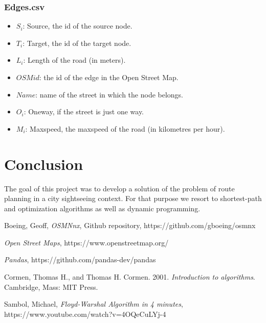 \documentclass{article}
\begin{document}
\subsubsection*{Edges.csv}
\begin{itemize}
    \item $S_i$: Source, the id of the source node.
    \item $T_i$: Target, the id of the target node.
    \item $L_i$: Length of the road (in meters).
    \item $OSM id$: the id of the edge in the Open Street Map.
    \item $Name$: name of the street in which the node belongs.
    \item $O_i$: Oneway, if the street is just one way.
    \item $M_i$: Maxspeed, the maxspeed of the road (in kilometres per hour).
\end{itemize}

\section*{Conclusion}

The goal of this project was to develop a solution of the problem of route planning in a city sightseeing context. For that purpose we resort to shortest-path and optimization algorithms as well as dynamic programming.

\begin{thebibliography}{9}

Boeing, Geoff, \textit{OSMNnx}, Github repository, https://github.com/gboeing/osmnx

\textit{Open Street Maps}, https://www.openstreetmap.org/

\textit{Pandas}, https://github.com/pandas-dev/pandas

Cormen, Thomas H., and Thomas H. Cormen. 2001. \textit{Introduction to algorithms}. Cambridge, Mass: MIT Press.

Sambol, Michael, \textit{Floyd-Warshal Algorithm in 4 minutes}, https://www.youtube.com/watch?v=4OQeCuLYj-4

\end{thebibliography}
\end{document}
